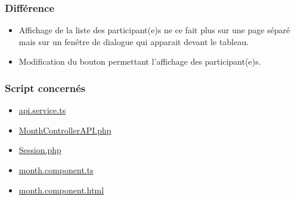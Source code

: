 \subsubsection{Différence}
	\begin{itemize}
		\item Affichage de la liste des participant(e)s ne ce fait plus sur une page séparé mais sur un fenêtre de dialogue qui apparait devant le tableau.
		\item Modification du bouton permettant l'affichage des participant(e)s. 
	\end{itemize}

\vspace{\baselineskip}
\subsubsection{Script concernés}
	\begin{itemize}
		\item \href{https://github.com/victorsmits/Aquabike/blob/master/frontend/src/app/service/api.service.ts}{api.service.ts}
		\item \href{https://github.com/victorsmits/Aquabike/blob/master/backend/src/Controller/API/MonthControllerAPI.php}{MonthControllerAPI.php}
		\item \href{https://github.com/victorsmits/Aquabike/blob/master/backend/src/Entity/Session.php}{Session.php}
		\item \href{https://github.com/victorsmits/Aquabike/blob/master/frontend/src/app/month/month.component.ts}{month.component.ts}
		\item \href{https://github.com/victorsmits/Aquabike/blob/master/frontend/src/app/month/month.component.html}{month.component.html}
	\end{itemize}

